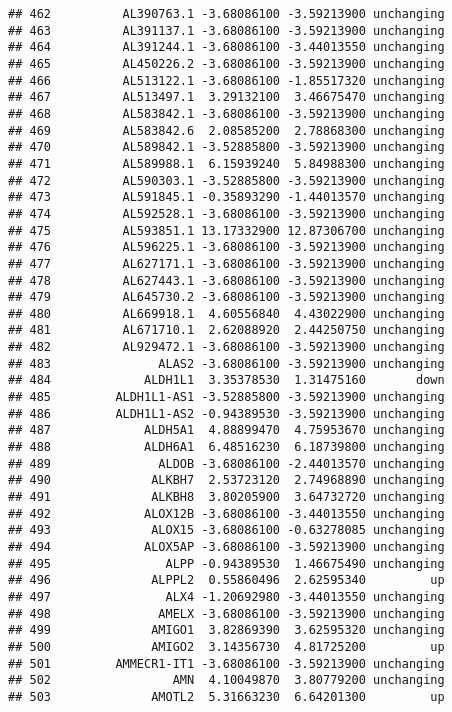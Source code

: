 \documentclass[]{article}
\begin{document}
\begin{verbatim}
## 462          AL390763.1 -3.68086100 -3.59213900 unchanging
## 463          AL391137.1 -3.68086100 -3.59213900 unchanging
## 464          AL391244.1 -3.68086100 -3.44013550 unchanging
## 465          AL450226.2 -3.68086100 -3.59213900 unchanging
## 466          AL513122.1 -3.68086100 -1.85517320 unchanging
## 467          AL513497.1  3.29132100  3.46675470 unchanging
## 468          AL583842.1 -3.68086100 -3.59213900 unchanging
## 469          AL583842.6  2.08585200  2.78868300 unchanging
## 470          AL589842.1 -3.52885800 -3.59213900 unchanging
## 471          AL589988.1  6.15939240  5.84988300 unchanging
## 472          AL590303.1 -3.52885800 -3.59213900 unchanging
## 473          AL591845.1 -0.35893290 -1.44013570 unchanging
## 474          AL592528.1 -3.68086100 -3.59213900 unchanging
## 475          AL593851.1 13.17332900 12.87306700 unchanging
## 476          AL596225.1 -3.68086100 -3.59213900 unchanging
## 477          AL627171.1 -3.68086100 -3.59213900 unchanging
## 478          AL627443.1 -3.68086100 -3.59213900 unchanging
## 479          AL645730.2 -3.68086100 -3.59213900 unchanging
## 480          AL669918.1  4.60556840  4.43022900 unchanging
## 481          AL671710.1  2.62088920  2.44250750 unchanging
## 482          AL929472.1 -3.68086100 -3.59213900 unchanging
## 483               ALAS2 -3.68086100 -3.59213900 unchanging
## 484             ALDH1L1  3.35378530  1.31475160       down
## 485         ALDH1L1-AS1 -3.52885800 -3.59213900 unchanging
## 486         ALDH1L1-AS2 -0.94389530 -3.59213900 unchanging
## 487             ALDH5A1  4.88899470  4.75953670 unchanging
## 488             ALDH6A1  6.48516230  6.18739800 unchanging
## 489               ALDOB -3.68086100 -2.44013570 unchanging
## 490              ALKBH7  2.53723120  2.74968890 unchanging
## 491              ALKBH8  3.80205900  3.64732720 unchanging
## 492             ALOX12B -3.68086100 -3.44013550 unchanging
## 493              ALOX15 -3.68086100 -0.63278085 unchanging
## 494             ALOX5AP -3.68086100 -3.59213900 unchanging
## 495                ALPP -0.94389530  1.46675490 unchanging
## 496              ALPPL2  0.55860496  2.62595340         up
## 497                ALX4 -1.20692980 -3.44013550 unchanging
## 498               AMELX -3.68086100 -3.59213900 unchanging
## 499              AMIGO1  3.82869390  3.62595320 unchanging
## 500              AMIGO2  3.14356730  4.81725200         up
## 501         AMMECR1-IT1 -3.68086100 -3.59213900 unchanging
## 502                 AMN  4.10049870  3.80779200 unchanging
## 503              AMOTL2  5.31663230  6.64201300         up

\end{verbatim}
\end{document}
